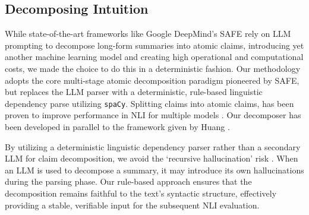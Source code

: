 \subsection{Decomposing Intuition}
While state-of-the-art frameworks like Google DeepMind's SAFE \cite{safe2024longform} rely on LLM prompting to decompose long-form summaries into atomic claims, introducing yet another machine learning model and creating high operational and computational costs, we made the choice to do this in a deterministic fashion. Our methodology adopts the core multi-stage atomic decomposition paradigm pioneered by SAFE, but replaces the LLM parser with a deterministic, rule-based linguistic dependency parse utilizing \texttt{spaCy}. Splitting claims into atomic claims, has been proven to improve performance in NLI for multiple models \cite{huang2026atomicsnlifinegrainednaturallanguage,laban2021summaC}. Our decomposer has been developed in parallel to the framework given by Huang \etal \cite{huang2026atomicsnlifinegrainednaturallanguage}. 


By utilizing a deterministic linguistic dependency parser rather than a secondary LLM for claim decomposition, we avoid the `recursive hallucination' risk \cite{yoo2026torlite}. When an LLM is used to decompose a summary, it may introduce its own hallucinations during the parsing phase. Our rule-based approach ensures that the decomposition remains faithful to the text's syntactic structure, effectively providing a stable, verifiable input for the subsequent NLI evaluation.

